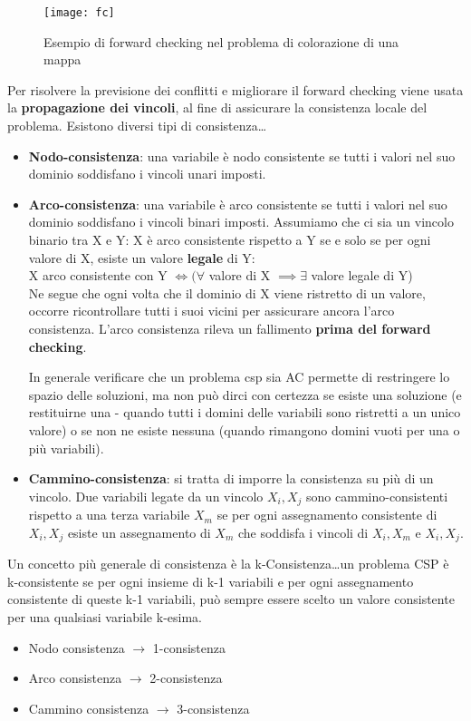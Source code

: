 \begin{figure}[H]
\centering
\texttt{[image: fc]}
\caption{Esempio di forward checking nel problema di colorazione di una mappa}
\label{fig:fc}
\end{figure}

Per risolvere la previsione dei conflitti e migliorare il forward checking viene
usata la \textbf{propagazione dei vincoli}, al fine di assicurare la
consistenza locale del problema. Esistono diversi tipi di consistenza\dots

\begin{itemize}
 \item \textbf{Nodo-consistenza}: una variabile è nodo consistente se tutti
i valori nel suo dominio soddisfano i vincoli unari imposti.
 \item \textbf{Arco-consistenza}: una variabile è arco consistente se tutti
i valori nel suo dominio soddisfano i vincoli binari imposti.
Assumiamo che ci sia un vincolo binario tra X e Y: X è arco consistente
rispetto a Y se e solo se per ogni valore di X, esiste un valore \textbf{legale}
di Y:\\

X arco consistente con Y $\iff (\forall$ valore di X $\implies \exists$ valore
legale di Y)\\

Ne segue che ogni volta che il dominio di X viene ristretto di un valore,
occorre ricontrollare tutti i suoi vicini per assicurare ancora l'arco consistenza.
L'arco consistenza rileva un fallimento \textbf{prima del forward checking}.

In generale verificare che un problema csp sia AC permette di restringere lo spazio
delle soluzioni, ma non può dirci con certezza se esiste una soluzione (e
restituirne una - quando tutti i domini delle variabili sono ristretti a un unico
valore) o se non ne esiste nessuna (quando rimangono domini vuoti per una o più variabili).
 \item \textbf{Cammino-consistenza}: si tratta di imporre la consistenza su più di un
vincolo. Due variabili legate da un vincolo ${X_i, X_j}$ sono cammino-consistenti rispetto
a una terza variabile $X_m$ se per ogni assegnamento consistente di ${X_i, X_j}$ esiste un
assegnamento di $X_m$ che soddisfa i vincoli di ${X_i, X_m}$ e ${X_i, X_j}$.
\end{itemize}

Un concetto più generale di consistenza è la k-Consistenza\dots un problema
CSP è k-consistente se per ogni insieme di k-1 variabili e per ogni assegnamento consistente
di queste k-1 variabili, può sempre essere scelto un valore consistente per una qualsiasi
variabile k-esima.

\begin{itemize}
 \item Nodo consistenza $\rightarrow$ 1-consistenza
 \item Arco consistenza $\rightarrow$ 2-consistenza
 \item Cammino consistenza $\rightarrow$ 3-consistenza
\end{itemize}
